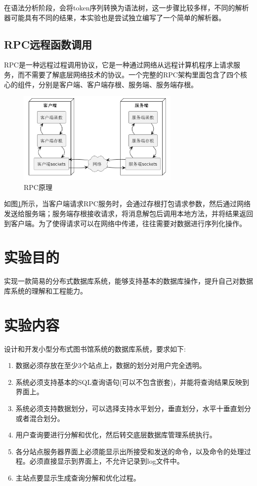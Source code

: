 在语法分析阶段，会将token序列转换为语法树，这一步骤比较多样，不同的解析器可能具有不同的结果，本实验也是尝试独立编写了一个简单的解析器。

\subsection{RPC远程函数调用}

RPC是一种远程过程调用协议，它是一种通过网络从远程计算机程序上请求服务，而不需要了解底层网络技术的协议。一个完整的RPC架构里面包含了四个核心的组件，分别是客户端、客户端存根、服务端、服务端存根。

\begin{figure}[H]
    \includegraphics[width=0.7\textwidth]{examples/rpc原理.png}
    \centering
    \caption{RPC原理}
    \label{fig:rpc}
\end{figure}

如图\ref{fig:rpc}所示，当客户端请求RPC服务时，会通过存根打包请求参数，然后通过网络发送给服务端；服务端存根接收请求，将消息解包后调用本地方法，并将结果返回到客户端。为了使得请求可以在网络中传递，往往需要对数据进行序列化操作。

\section{实验目的}

实现一款简易的分布式数据库系统，能够支持基本的数据库操作，提升自己对数据库系统的理解和工程能力。

\section{实验内容}

设计和开发小型分布式图书馆系统的数据库系统，要求如下:
\begin{enumerate}
    \item 数据必须存放在至少3个站点上，数据的划分对用户完全透明。
    \item 系统必须支持基本的SQL查询语句(可以不包含嵌套)，并能将查询结果反映到界面上。
    \item 系统必须支持数据划分，可以选择支持水平划分，垂直划分，水平十垂直划分或者混合划分。
    \item 用户查询要进行分解和优化，然后转交底层数据库管理系统执行。
    \item 各分站点服务器界面上必须能显示出所接受和发送的命令，以及命令的处理过程。必须直接显示到界面上，不允许记录到log文件中。
    \item 主站点要显示生成查询分解和优化过程。
\end{enumerate}

